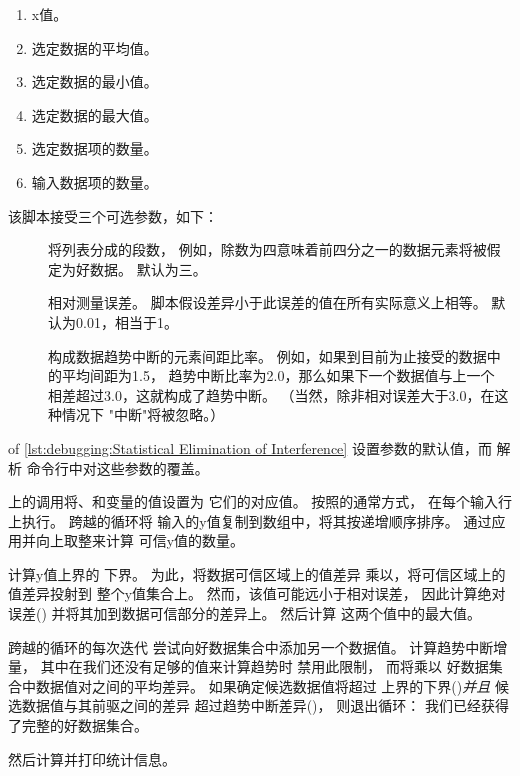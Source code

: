 \begin{enumerate}
\item	x值。
\item	选定数据的平均值。
\item	选定数据的最小值。
\item	选定数据的最大值。
\item	选定数据项的数量。
\item	输入数据项的数量。
\end{enumerate}

该脚本接受三个可选参数，如下：

\begin{description}
\item	[\nf{:}] 将列表分成的段数，
	例如，除数为四意味着前四分之一的数据元素将被假定为好数据。
	默认为三。
\item	[\nf{:}] 相对测量误差。
	脚本假设差异小于此误差的值在所有实际意义上相等。
	默认为0.01，相当于1\pct。
\item	[\nf{:}] 构成数据趋势中断的元素间距比率。
	例如，如果到目前为止接受的数据中的平均间距为1.5，
	趋势中断比率为2.0，那么如果下一个数据值与上一个
	相差超过3.0，这就构成了趋势中断。
	（当然，除非相对误差大于3.0，在这种情况下
	"中断"将被忽略。）
\end{description}

\begin{fcvref}
 of
\cref{lst:debugging:Statistical Elimination of Interference}
设置参数的默认值，而
解析
命令行中对这些参数的覆盖。
\end{fcvref}
\begin{fcvref}
上的调用将、和变量的值设置为
它们的对应值。
按照的通常方式，
在每个输入行上执行。
跨越的循环将
输入的y值复制到数组中，将其按递增顺序排序。
通过应用并向上取整来计算
可信y值的数量。

计算y值上界的
下界。
为此，将数据可信区域上的值差异
乘以，将可信区域上的值差异投射到
整个y值集合上。
然而，该值可能远小于相对误差，
因此计算绝对误差()
并将其加到数据可信部分的差异上。
然后计算
这两个值中的最大值。

跨越的循环的每次迭代
尝试向好数据集合中添加另一个数据值。
计算趋势中断增量，
其中在我们还没有足够的值来计算趋势时
禁用此限制，
而将乘以
好数据集合中数据值对之间的平均差异。
如果确定候选数据值将超过
上界的下界()\emph{并且}
候选数据值与其前驱之间的差异
超过趋势中断差异()，
则退出循环：
我们已经获得了完整的好数据集合。

然后计算并打印统计信息。
\end{fcvref}

